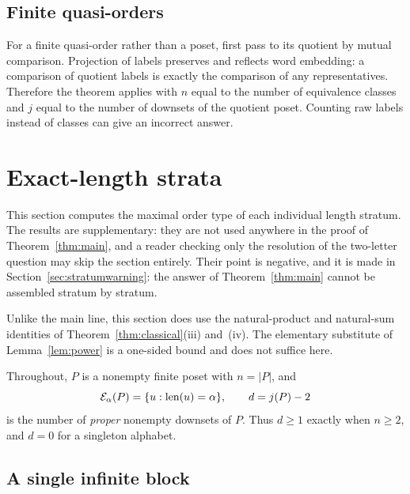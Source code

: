 \documentclass[11pt,a4paper]{article}
\numberwithin{equation}{section}
\theoremstyle{definition}
\theoremstyle{remark}
\newcommand{\len}{\mathop{\rm len}}
\newcommand{\E}{\mathcal E}
\begin{document}
\subsection{Finite quasi-orders}
For a finite quasi-order rather than a poset, first pass to its quotient
by mutual comparison. Projection of labels preserves and reflects word
embedding: a comparison of quotient labels is exactly the comparison of
any representatives. Therefore the theorem applies with $n$ equal to the
number of equivalence classes and $j$ equal to the number of downsets of
the quotient poset. Counting raw labels instead of classes can give an
incorrect answer.

\section{Exact-length strata}
\label{sec:exact}

This section computes the maximal order type of each individual length
stratum. The results are supplementary: they are not used anywhere in the
proof of Theorem~\ref{thm:main}, and a reader checking only the resolution of
the two-letter question may skip the section entirely. Their point is
negative, and it is made in Section~\ref{sec:stratumwarning}: the answer of
Theorem~\ref{thm:main} cannot be assembled stratum by stratum.

Unlike the main line, this section does use the natural-product and
natural-sum identities of Theorem~\ref{thm:classical}(iii) and~(iv). The
elementary substitute of Lemma~\ref{lem:power} is a one-sided bound and does
not suffice here.

Throughout, $P$ is a nonempty finite poset with $n=|P|$, and
\[
 \E_\alpha(P)=\{u:\len(u)=\alpha\},
 \qquad
 d=j(P)-2
\]
is the number of \emph{proper} nonempty downsets of $P$. Thus $d\ge1$ exactly
when $n\ge2$, and $d=0$ for a singleton alphabet.

\subsection{A single infinite block}
\end{document}
